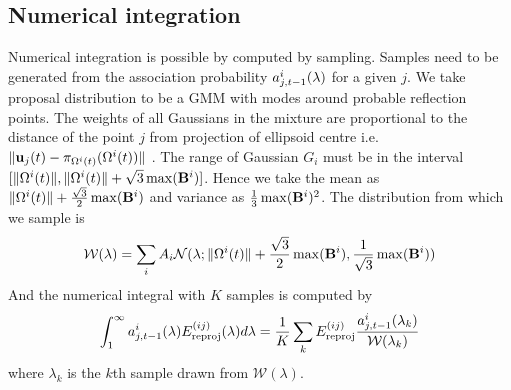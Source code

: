 \documentclass[10pt,twocolumn,letterpaper]{article}
\begin{document}
\subsection{Numerical integration}
Numerical integration is possible by computed by sampling. Samples need to be
generated from the association probability $a^{i}_{j,t-1}(\lambda)$ for a given $j$. We take
proposal distribution to be a GMM with modes around probable reflection points.
The weights of all Gaussians in the mixture are proportional to the distance of
the point $j$ from projection of ellipsoid centre i.e. $\|\mathbf{u}_j(t) - \pi_{\Omega^{i}(t)}(\Omega^{i}(t))\|$ . The range of Gaussian $G_i$
must be in the interval $[\|\Omega^{i}(t)\|, \|\Omega^{i}(t)\| +
\sqrt{3}\max(\mathbf{B}^{i})]$. Hence we take the mean as $\|\Omega^{i}(t)\| +
\frac{\sqrt{3}}{2}\max(\mathbf{B}^{i})$ and variance as
$\frac{1}{3}\max(\mathbf{B}^{i})^2$. The distribution from which we sample is 
\newcommand{\Gauss}{\mathcal{N}}
\newcommand{\PropDist}{\mathcal{W}}
\begin{align}
  \PropDist(\lambda) = \sum_i A_i \Gauss(\lambda; \|\relp{i}{t}\| +
  \frac{\sqrt{3}}{2}\max(\dimsn{i}), \frac{1}{\sqrt{3}}\max(\dimsn{i}))
\end{align}
And the numerical integral with $K$ samples is computed by
\begin{align}
    \int_1^{\infty}
    \assocP
    \Ereproj(\lambda)
    d\lambda
    =
    \frac{1}{K}\sum_k \Ereproj \frac{\assocPk}{\PropDist(\lambda_k)}
\end{align}
where $\lambda_k$ is the $k$th sample drawn from $\PropDist(\lambda)$.
\end{document}

